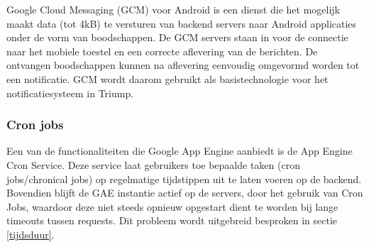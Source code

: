 Google Cloud Messaging (GCM) voor Android is een dienst die het mogelijk maakt data (tot 4kB) te versturen van backend servers naar Android applicaties onder de vorm van boodschappen. De GCM servers staan in voor de connectie naar het mobiele toestel en een correcte aflevering van de berichten. De ontvangen boodschappen kunnen na aflevering eenvoudig omgevormd worden tot een notificatie. GCM wordt daarom gebruikt als basistechnologie voor het notificatiesysteem in Triump.

\subsubsection{Cron jobs~\cite{Google_Cron_Jobs}}

Een van de functionaliteiten die Google App Engine aanbiedt is de App Engine Cron Service. Deze service laat gebruikers toe bepaalde taken (cron jobs/chronical jobs) op regelmatige tijdstippen uit te laten voeren op de backend. Bovendien blijft de GAE instantie actief op de servers, door het gebruik van Cron Jobs, waardoor deze niet steeds opnieuw opgestart dient te worden bij lange timeouts tussen requests. Dit probleem wordt uitgebreid besproken in sectie \ref{tijdsduur}.


